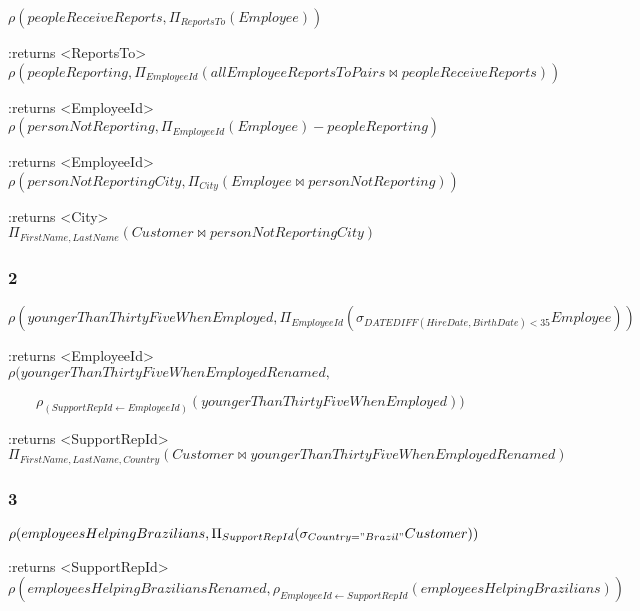 \documentclass[10pt]{article}
\begin{document}
			$ \rho( peopleReceiveReports, \Pi_{ReportsTo}(Employee)) $
			
			:returns <ReportsTo> \\
			
			$ \rho(peopleReporting, \Pi_{EmployeeId}( allEmployeeReportsToPairs \bowtie peopleReceiveReports ) ) $
			
			:returns <EmployeeId>\\
			
			$ \rho(personNotReporting, \Pi_{EmployeeId}(Employee) - peopleReporting) $
			
			:returns <EmployeeId> \\
			
			$ \rho(personNotReportingCity, \Pi_{City}(Employee \bowtie personNotReporting)) $
			
			:returns <City> \\
			
			$ \Pi_{FirstName, LastName}(Customer \bowtie personNotReportingCity) $
		
			
			\subsubsection*{2}
			
			$ \rho(youngerThanThirtyFiveWhenEmployed, \Pi_{EmployeeId}( \sigma_{DATEDIFF(HireDate, BirthDate) < 35} Employee ) ) $

			:returns <EmployeeId>\\
			
			$ \rho(youngerThanThirtyFiveWhenEmployedRenamed,$
			
			$\quad\quad \rho_{(SupportRepId \leftarrow EmployeeId)}(youngerThanThirtyFiveWhenEmployed) ) $
			
			:returns <SupportRepId>\\
			
			$ \Pi_{FirstName, LastName, Country}(Customer \bowtie youngerThanThirtyFiveWhenEmployedRenamed) $
			
			\subsubsection*{3}
			
			$ \rho(employeesHelpingBrazilians,
			\Pi_{SupportRepId}( \sigma_{Country="Brazil"} Customer) ) $
			
			:returns <SupportRepId>\\
			
			$ \rho(employeesHelpingBraziliansRenamed, \rho_{EmployeeId \leftarrow SupportRepId}(employeesHelpingBrazilians) ) $
			
\end{document}

